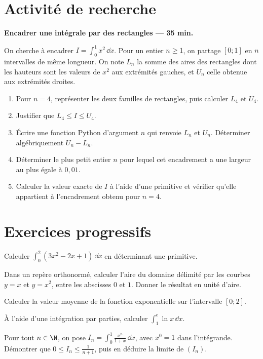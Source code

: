 \section{Activité de recherche}\textbf{Encadrer une intégrale par des rectangles --- 35 min.}\par On cherche à encadrer $I=\displaystyle\int_0^1x^2\,\dd x$. Pour un entier $n\ge1$, on partage $[0;1]$ en $n$ intervalles de même longueur. On note $L_n$ la somme des aires des rectangles dont les hauteurs sont les valeurs de $x^2$ aux extrémités gauches, et $U_n$ celle obtenue aux extrémités droites.
\begin{enumerate}\item Pour $n=4$, représenter les deux familles de rectangles, puis calculer $L_4$ et $U_4$.
\item Justifier que $L_4\le I\le U_4$.
\item Écrire une fonction Python d'argument $n$ qui renvoie $L_n$ et $U_n$. Déterminer algébriquement $U_n-L_n$.
\item Déterminer le plus petit entier $n$ pour lequel cet encadrement a une largeur au plus égale à $0{,}01$.
\item Calculer la valeur exacte de $I$ à l'aide d'une primitive et vérifier qu'elle appartient à l'encadrement obtenu pour $n=4$.\end{enumerate}

\section{Exercices progressifs}

Calculer $\displaystyle\int_0^2(3x^2-2x+1)\,\dd x$ en déterminant une primitive.

Dans un repère orthonormé, calculer l'aire du domaine délimité par les courbes $y=x$ et $y=x^2$, entre les abscisses $0$ et $1$. Donner le résultat en unité d'aire.

Calculer la valeur moyenne de la fonction exponentielle sur l'intervalle $[0;2]$.

À l'aide d'une intégration par parties, calculer $\displaystyle\int_1^e\ln x\,\dd x$.

Pour tout $n\in\N$, on pose $I_n=\displaystyle\int_0^1\frac{x^n}{1+x}\,\dd x$, avec $x^0=1$ dans l'intégrande. Démontrer que $0\le I_n\le\frac1{n+1}$, puis en déduire la limite de $(I_n)$.

